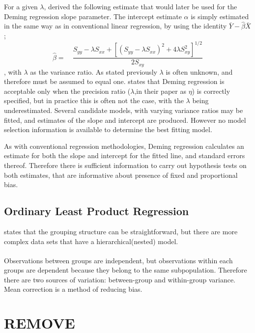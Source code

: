 \documentclass[12pt, a4paper]{report}
\theoremstyle{plain}
\theoremstyle{definition}
\theoremstyle{remark}
\begin{document}
For a given $\lambda$, \citet{Kummel} derived the following estimate that would later be used for the Deming regression slope
parameter. The intercept estimate $\alpha$ is simply estimated in the same way as in conventional linear
regression, by using the identity $\bar{Y}-\hat{\beta}\bar{X}$;
\begin{equation}
\hat{\beta} =\quad \frac{S_{yy} - \lambda S_{xx}+[(S_{yy} -
\lambda S_{xx})^{2}+ 4\lambda S^{2}_{xy}]^{1/2}}{2S_{xy}}
\end{equation},
with $\lambda$ as the variance ratio. As stated previously $\lambda$ is often unknown, and therefore must be assumed to equal one. \citet{CarollRupert} states that Deming
regression is acceptable only when the precision ratio ($\lambda$,in their paper as $\eta$) is correctly specified, but in practice this is often not the case, with the $\lambda$ being underestimated. Several candidate models, with varying variance ratios may be fitted, and estimates of the slope and intercept are produced. However no model selection information is available to determine the best fitting model.

As with conventional regression methodologies, Deming regression calculates an estimate for both the slope and intercept for the
fitted line, and standard errors thereof. Therefore there is sufficient information to carry out hypothesis tests on both
estimates, that are informative about presence of fixed and proportional bias.





\section{Ordinary Least Product Regression}
\citet{ludbrook97} states that the grouping structure can be
straightforward, but there are more complex data sets that have a
hierarchical(nested) model.
\\
\\
Observations between groups are independent, but observations
within each groups are dependent because they belong to the same
subpopulation. Therefore there are two sources of variation:
between-group and within-group variance.
 \vspace{5 mm} \noindent Mean correction is a method of reducing
bias.


\chapter{REMOVE}
\end{document}
